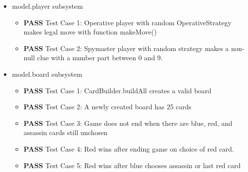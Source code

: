 \documentclass[12pt]{article}
\begin{document}
\begin{itemize}
\item model.player subsystem
\begin{itemize}
    \item \textbf{PASS} Test Case 1: Operative player with random OperativeStrategy makes legal move with function makeMove() 
    
    \item \textbf{PASS} Test Case 2: Spymaster player with random strategy makes a non-null clue with a number part between 0 and 9.
\end{itemize}

\item model.board subsystem
\begin{itemize}
    \item \textbf{PASS} Test Case 1: CardBuilder.buildAll creates a valid board
    \item \textbf{PASS} Test Case 2: A newly created board has 25 cards
    \item \textbf{PASS} Test Case 3: Game does not end when there are blue, red, and assassin cards still unchosen
    \item \textbf{PASS} Test Case 4: Red wins after ending game on choice of red card.
    \item \textbf{PASS} Test Case 5: Red wins after blue chooses assassin or last red card
\end{itemize}
\end{itemize}
\end{document}

